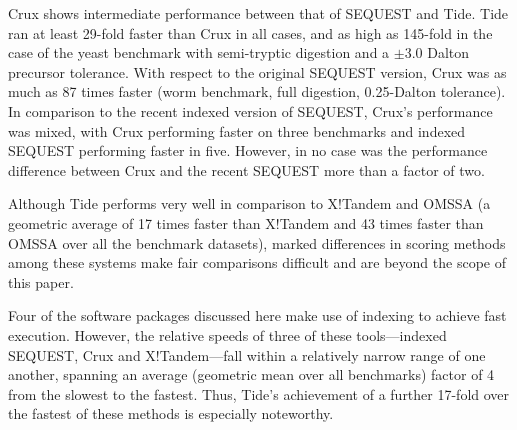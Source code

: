 Crux shows intermediate performance between that of SEQUEST and
Tide. Tide ran at least 29-fold faster than Crux in all cases, and as
high as 145-fold in the case of the yeast benchmark with semi-tryptic
digestion and a $\pm 3.0$ Dalton precursor tolerance. With respect to
the original SEQUEST version, Crux was as much as 87 times faster
(worm benchmark, full digestion, 0.25-Dalton tolerance). In comparison
to the recent indexed version of SEQUEST, Crux's performance was
mixed, with Crux performing faster on three benchmarks and indexed
SEQUEST performing faster in five. However, in no case was the
performance difference between Crux and the recent SEQUEST more than a
factor of two.

Although Tide performs very well in comparison to X!Tandem and OMSSA
(a geometric average of 17 times faster than X!Tandem and 43 times
faster than OMSSA over all the benchmark datasets), marked differences
in scoring methods among these systems make fair comparisons difficult
and are beyond the scope of this paper.

Four of the software packages discussed here make use of indexing to
achieve fast execution.  However, the relative speeds of three of
these tools---indexed SEQUEST, Crux and X!Tandem---fall within a
relatively narrow range of one another, spanning an average (geometric
mean over all benchmarks) factor of 4 from the slowest to the
fastest. Thus, Tide's achievement of a further 17-fold over the
fastest of these methods is especially noteworthy.

